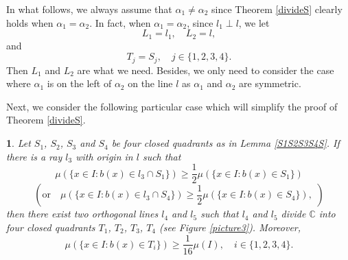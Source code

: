 \documentclass[oneside,english,a4wide]{amsart}
\numberwithin{equation}{section}
\numberwithin{figure}{section}
\theoremstyle{plain}
\theoremstyle{plain}
\theoremstyle{definition}
\theoremstyle{plain}
\newtheorem{lem}[thm]{\protect\lemmaname}
\theoremstyle{remark}
\theoremstyle{definition}
\theoremstyle{remark}
\theoremstyle{definition}
\providecommand{\lemmaname}{Lemma}
\newcommand{\8}{\infty}
\begin{document}
In what follows, we always assume that $\alpha_1\neq \alpha_2$ since Theorem \ref{divideS} clearly holds when $\alpha_1=\alpha_2$. In fact, when $\alpha_1=\alpha_2$, since $l_1\perp l$, we let 
\begin{equation*}
	L_1=l_1,\quad L_2=l,
\end{equation*}
and
\begin{equation*}
	T_j=S_j,\quad j\in\{1,2,3,4\}.
\end{equation*}
Then $L_1$ and $L_2$ are what we need. Besides, we only need to consider the case where $\alpha_1$ is on the left of $\alpha_2$ on the line $l$ as $\alpha_1$ and $\alpha_2$ are symmetric. 

Next, we consider the following particular case which will simplify the proof of Theorem \ref{divideS}.	
\begin{lem}\label{middlecases}
	 Let $S_1$, $S_2$, $S_3$ and $S_4$ be four closed quadrants as in Lemma \ref{S1S2S3S4S}. If there is a ray $l_3$ with origin in $l$ such that 
	\begin{equation*}
		\mu(\{x\in I:b(x)\in l_3\cap S_1\})\ge \frac{1}{2}\mu(\{x\in I:b(x)\in S_1\})
	\end{equation*}
	\begin{equation*}
		(\text{or}\quad	\mu(\{x\in I:b(x)\in l_3\cap S_4\})\ge \frac{1}{2}\mu(\{x\in I:b(x)\in S_4\}),\,\,)
	\end{equation*}
	then there exist two orthogonal lines $l_4$ and $l_5$ such that $l_4$ and $l_5$ divide $\mathbb{C}$ into four closed quadrants $T_1$, $T_2$, $T_3$, $T_4$ (see Figure \ref{picture3}). Moreover,
	\begin{equation*}
		\mu(\{x\in I:b(x)\in T_i\})\ge \frac{1}{16}\mu(I),\quad i\in \{1,2,3,4\}.
	\end{equation*}
\end{lem}
\end{document}
